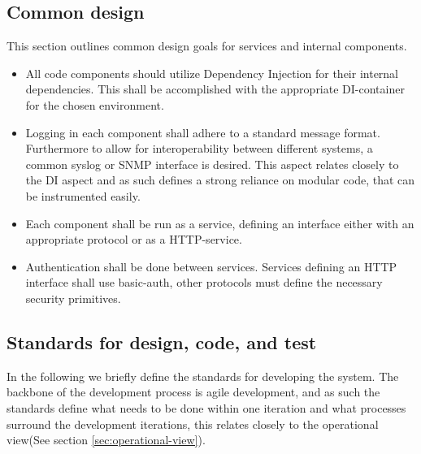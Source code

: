 \subsection{Common design}
\label{sec:common-design}
This section outlines common design goals for services and internal components.

\begin{itemize}
    \item All code components should utilize Dependency Injection for their
        internal dependencies. This shall be accomplished with the appropriate
        DI-container for the chosen environment.
    \item Logging in each component shall adhere to a standard message format.
        Furthermore to allow for interoperability between different systems, a
        common syslog or SNMP interface is desired. This aspect relates closely
        to the DI aspect and as such defines a strong reliance on modular code,
        that can be instrumented easily.
    \item Each component shall be run as a service, defining an interface
        either with an appropriate protocol or as a HTTP-service.
    \item Authentication shall be done between services. Services defining an
        HTTP interface shall use basic-auth, other protocols must define the
        necessary security primitives.
\end{itemize}

\subsection{Standards for design, code, and test}
\label{sec:stand-design-code}
In the following we briefly define the standards for developing the system. The
backbone of the development process is agile development, and as such the
standards define what needs to be done within one iteration and what processes
surround the development iterations, this relates closely to the operational
view(See section \ref{sec:operational-view}).

